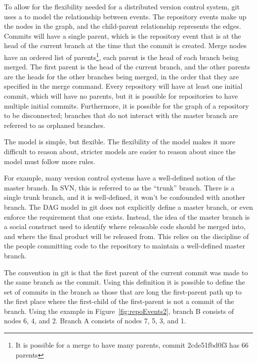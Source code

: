 To allow for the flexibility needed for a distributed version control
system, git uses a  to model the
relationship between events.
The repository events make up the nodes in the graph, and the
child-parent relationship represents the edges.
Commits will have a single parent, which is the repository event that
is at the head of the current branch at the time that the commit
is created.
Merge nodes have an ordered list of
parents\footnote{It is possible for a merge to have many parents, commit
  2cde51fbd0f3 has 66 parents},
each parent is the head of each branch being merged.
The first parent is the head of the current branch, and the other
parents are the heads for the other branches being merged, in the order
that they are specified in the merge command.
Every repository will have at least one initial commit, which
will have no parents, but it is possible for repositories to have
multiple initial commits.
Furthermore, it is possible for the graph of a repository to be
disconnected; branches that do not interact with the master branch are
referred to as orphaned branches.

The model is simple, but flexible.
The flexibility of the model makes it more difficult to reason about,
stricter models are easier to reason about since the model must follow
more rules.

For example, many version control systems have a well-defined notion of
the master branch.
In SVN, this is referred to as the ``trunk'' branch.
There is a single trunk branch, and it is well-defined, it won't be
confounded with another branch.
The DAG model in git does not explicitly define a master branch, or even
enforce the requirement that one exists.
Instead, the idea of the master branch is a social construct used to
identify where releasable code should be merged into, and where the
final product will be released from.
This relies on the discipline of the people committing code to the
repository to maintain a well-defined master branch.

The convention in git is that the first parent of the current commit was
made to the same branch as the commit. Using this definition it is
possible to define the set of commits in the branch as those that are
long the first-parent path up to the first place where the first-child
of the first-parent is not a commit of the branch.
Using the example in Figure~\ref{fig:repoEvents2}, branch B consists of
nodes 6, 4, and 2. Branch A consists of nodes 7, 5, 3, and 1.


